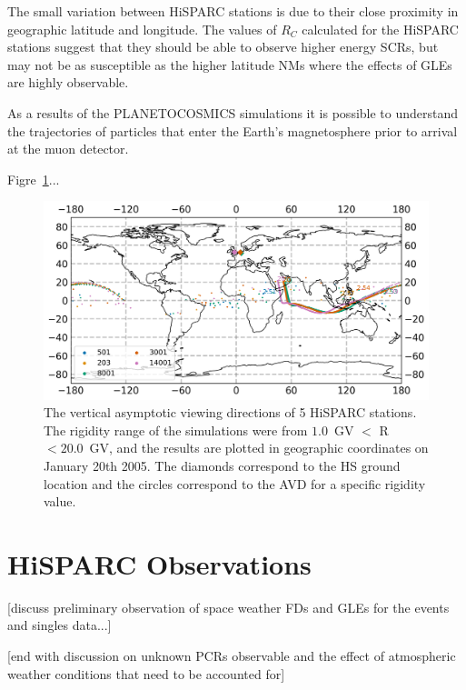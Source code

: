 The small variation between HiSPARC stations is due to their close proximity in geographic latitude and longitude. The values of $R_C$ calculated for the HiSPARC stations suggest that they should be able to observe higher energy SCRs, but may not be as susceptible as the higher latitude NMs where the effects of GLEs are highly observable.

As a results of the PLANETOCOSMICS simulations it is possible to understand the trajectories of particles that enter the Earth's magnetosphere prior to arrival at the muon detector.

Figre~\ref{fig:HS_AVD}...

\begin{figure}[ht]
	\centering
	\includegraphics[scale=0.6]{HS_AVDs.png}
	\caption{The vertical asymptotic viewing directions of 5 HiSPARC stations. The rigidity range of the simulations were from $1.0$~GV $<$ R $<20.0$~GV, and the results are plotted in geographic coordinates on January 20th 2005. The diamonds correspond to the HS ground location and the circles correspond to the AVD for a specific rigidity value.}
	\label{fig:HS_AVD}
\end{figure}


 

\section{HiSPARC Observations}\label{sec:HS_obs}


[discuss preliminary observation of space weather FDs and GLEs for the events and singles data...]

[end with discussion on unknown PCRs observable and the effect of atmospheric weather conditions that need to be accounted for]

